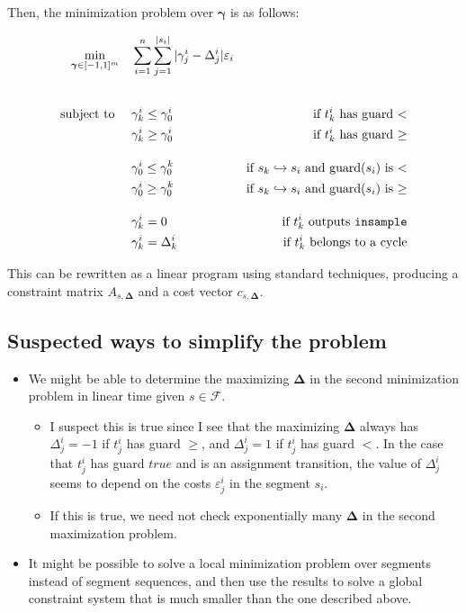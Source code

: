 \documentclass{article}
\renewcommand{\epsilon}{\varepsilon}
\begin{document}
Then, the minimization problem over $\boldsymbol{\gamma}$ is as follows:

\begin{align*}
\min_{\boldsymbol{\gamma} \in [-1, 1]^m} \quad & \sum_{i = 1}^n \sum_{j = 1}^{|s_i|} |\gamma^i_j - \Delta^i_j| \epsilon_i \\[2em]
\text{subject to } \quad 
& \gamma^i_k \leq \gamma^i_0 &\text{if $t^i_k$ has guard $<$} \\
& \gamma^i_k \geq \gamma^i_0 &\text{if $t^i_k$ has guard $\geq$} 
\\[1em]
& \gamma^i_0 \leq \gamma_0^k &\text{if $s_k \hookrightarrow s_i$ and guard($s_i$) is $<$} \\
& \gamma^i_0 \geq \gamma_0^k &\text{if $s_k \hookrightarrow s_i$ and guard($s_i$) is $\geq$} 
\\[1em]
& \gamma^i_k = 0 &\text{if $t^i_k$ outputs \texttt{insample}} \\
& \gamma^i_k = \Delta^i_k &\text{if $t^i_k$ belongs to a cycle} 
\end{align*}

This can be rewritten as a linear program using standard techniques, producing a constraint matrix $A_{s, \boldsymbol{\Delta}}$ and a cost vector $c_{s, \boldsymbol{\Delta}}$.

\subsection{Suspected ways to simplify the problem}

\begin{itemize}
    \item We might be able to determine the maximizing $\boldsymbol{\Delta}$ in the second minimization problem in linear time given $s \in \mathcal{F}$. 
    \begin{itemize}
        \item I suspect this is true since I see that the maximizing $\boldsymbol{\Delta}$ always has $\Delta^i_j = -1$ if $t^{i}_j$ has guard $\geq$, and $\Delta^i_j = 1$ if $t^{i}_j$ has guard $<$. In the case that $t^{i}_j$ has guard $true$ and is an assignment transition, the value of $\Delta^i_j$ seems to depend on the costs $\epsilon^i_j$ in the segment $s_i$.
        \item If this is true, we need not check exponentially many $\boldsymbol{\Delta}$ in the second maximization problem.
    \end{itemize}
    \item It might be possible to solve a local minimization problem over segments instead of segment sequences, and then use the results to solve a global constraint system that is much smaller than the one described above.
\end{itemize}
\end{document}
